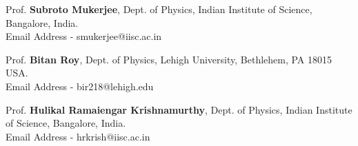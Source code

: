 

\begin{cventries}


\begin{cvitems}

  \item{Prof. \textbf{Subroto Mukerjee},} %
	{Dept. of Physics, Indian Institute of Science, Bangalore, India.} %
	{} %
	{\\}
	{Email Address - smukerjee@iisc.ac.in} %
  \item{Prof. \textbf{Bitan Roy},} %
	{Dept. of Physics, Lehigh University, Bethlehem, PA 18015
		USA.} %
	{} %
	{\\}
	{Email Address - bir218@lehigh.edu} %

  \item{Prof. \textbf{Hulikal Ramaiengar Krishnamurthy},} %
	{Dept. of Physics, Indian Institute of Science, Bangalore, India.} %
    {} %
    {\\}
    {Email Address - hrkrish@iisc.ac.in} %

\end{cvitems}
\end{cventries}
